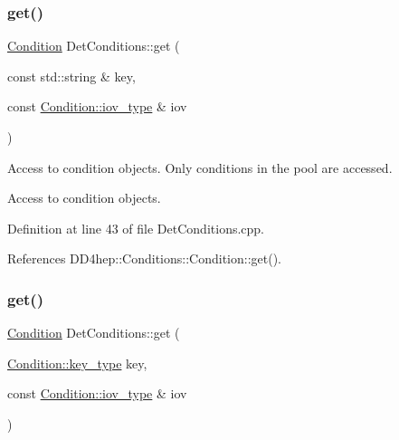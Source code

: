 \subsubsection{\texorpdfstring{get()}{get()}\hspace{0.1cm}{\footnotesize\ttfamily [3/4]}}
{\footnotesize\ttfamily \hyperlink{class_d_d4hep_1_1_conditions_1_1_condition}{Condition} Det\+Conditions\+::get (\begin{DoxyParamCaption}\item[{const std\+::string \&}]{key,  }\item[{const \hyperlink{class_d_d4hep_1_1_conditions_1_1_condition_ad84300e226b2085ec5e9db7f47be5539}{Condition\+::iov\+\_\+type} \&}]{iov }\end{DoxyParamCaption})}



Access to condition objects. Only conditions in the pool are accessed. 

Access to condition objects. 

Definition at line 43 of file Det\+Conditions.\+cpp.



References D\+D4hep\+::\+Conditions\+::\+Condition\+::get().

\hypertarget{class_d_d4hep_1_1_conditions_1_1_det_conditions_a27faa309035740b80ff2053fff6f30ba}{}\label{class_d_d4hep_1_1_conditions_1_1_det_conditions_a27faa309035740b80ff2053fff6f30ba} 
\subsubsection{\texorpdfstring{get()}{get()}\hspace{0.1cm}{\footnotesize\ttfamily [4/4]}}
{\footnotesize\ttfamily \hyperlink{class_d_d4hep_1_1_conditions_1_1_condition}{Condition} Det\+Conditions\+::get (\begin{DoxyParamCaption}\item[{\hyperlink{class_d_d4hep_1_1_conditions_1_1_condition_a7528efa762e8cc072ef80ea67c3531f9}{Condition\+::key\+\_\+type}}]{key,  }\item[{const \hyperlink{class_d_d4hep_1_1_conditions_1_1_condition_ad84300e226b2085ec5e9db7f47be5539}{Condition\+::iov\+\_\+type} \&}]{iov }\end{DoxyParamCaption})}



